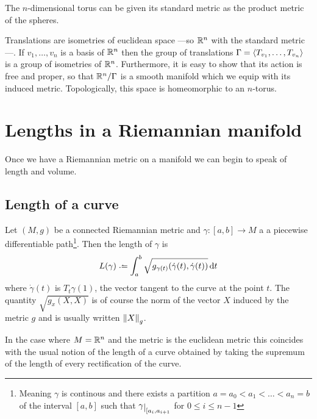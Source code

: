 \documentclass[12pt,twoside]{book}
\begin{document}
\begin{example}
	The \( n \)-dimensional torus can be given its standard metric as the product metric of
	the spheres. 

	Translations are isometries of euclidean space ---so \( \mathbb{R}^n \) with the standard
	metric---. If \( v_1, \dots, v_n \) is a basis of  \( \mathbb{R}^n \) then the group of
	translations \( \Gamma = \langle T_{v_1}, \dots, T_{v_n} \rangle \) is a group of isometries of \(
	\mathbb{R}^n \). Furthermore, it is easy to show that its action is free and proper, so that \(
	\mathbb{R}^n/\Gamma \) is a smooth manifold which we equip with its induced metric.
	Topologically, this space is homeomorphic to an \( n \)-torus. 
\end{example}

\section{Lengths in a Riemannian manifold}
Once we have a Riemannian metric on a manifold we can begin to speak of length and volume.

\subsection{Length of a curve}
\begin{definition}
	Let \( (M,g) \) be a connected Riemannian metric and \( \gamma \colon [a,b] \to M \) a a
	piecewise differentiable path\footnote{Meaning \( \gamma \) is continous and there
	exists a partition \( a = a_0 < a_1 < \dots < a_n = b \) of the interval \( [a,b] \)
such that \( \gamma\rest{[a_i, a_{i+1}} \) for \( 0 \leq i \leq n-1 \)}. Then the length
of \( \gamma \) is
	\begin{equation*}
		L(\gamma) \defeq \int_a^b \sqrt{g_{\gamma(t)}(\dot{\gamma}(t), \dot{\gamma}(t))} \ud t
	\end{equation*}
	where \( \dot{\gamma}(t) \) is \( T_t \gamma (1) \), the vector tangent to the curve at
	the point \( t \). The quantity \( \sqrt{g_x(X,X)} \) is of course the norm of the
	vector \( X \) induced by the metric \( g \) and is usually written \( \left\lVert X \right\rVert_g \).
\end{definition}
In the case where \( M = \mathbb{R}^n \) and the metric is the euclidean metric this coincides
with the usual notion of the length of a curve obtained by taking the supremum of the
length of every rectification of the curve.  
\end{document}
